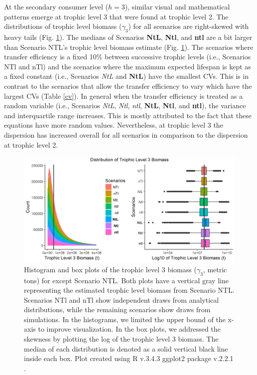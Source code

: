 \documentclass[oneside,12pt,final]{sty/ucthesis-CA2012}
\let\cite\citep                             %
\begin{document}
\begin{mainmatter}
At the secondary consumer level ($h=3$), similar visual and mathematical patterns emerge at trophic level 3 that were found at trophic level 2. The distributions of trophic level biomass ($\gamma_3$) for all scenarios are right-skewed with heavy tails (Fig. \ref{beta3estimated}). The medians of Scenarios \textbf{NtL}, \textbf{Ntl}, and \textbf{ntl} are a bit larger than Scenario NTL's trophic level biomass estimate (Fig. \ref{beta3estimated}). The scenarios where transfer efficiency is a fixed 10\% between successive trophic levels (i.e., Scenarios NTl and nTl) and the scenarios where the maximum expected lifespan is kept as a fixed constant (i.e., Scenarios \textit{NtL} and \textbf{NtL}) have the smallest CVs. This is in contrast to the scenarios that allow the transfer efficiency to vary which have the largest CVs (Table \ref{cv}). In general when the transfer efficiency is treated as a random variable (i.e., Scenarios \textit{NtL}, \textit{Ntl}, \textit{ntl}, \textbf{NtL}, \textbf{Ntl}, and \textbf{ntl}), the variance and interquartile range increases. This is mostly attributed to the fact that these equations have more random values. Nevertheless, at trophic level 3 the dispersion has increased overall for all scenarios in comparison to the dispersion at trophic level 2. 

\begin{figure}[H]
     \centering
       \includegraphics[width=1\textwidth]{fig/biomass3_hist_box_v3.png}
    \caption{Histogram and box plots of the trophic level 3 biomass ($\gamma_3$, metric tons) for except Scenario NTL. Both plots have a vertical gray line representing the estimated trophic level biomass from Scenario NTL. Scenarios NTl and nTl show independent draws from analytical distributions, while the remaining scenarios show draws from simulations. In the histograms, we limited the upper bound of the x-axis to improve visualization. In the box plots, we addressed the skewness by plotting the log of the trophic level 3 biomass. The median of each distribution is denoted as a solid vertical black line inside each box. Plot created using R v.3.4.3 \cite{Rcite} ggplot2 package v.2.2.1 \cite{ggplot}. }
    \label{beta3estimated}
\end{figure}


\end{mainmatter}
\end{document}
